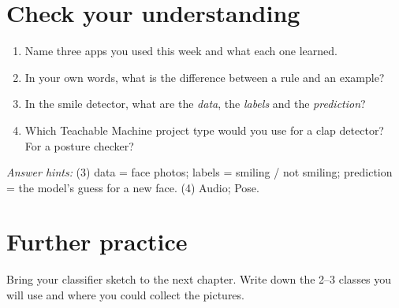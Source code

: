 \section*{Check your understanding}

\begin{enumerate}
\item Name three apps you used this week and what each one learned.
\item In your own words, what is the difference between a rule and an example?
\item In the smile detector, what are the \emph{data}, the \emph{labels} and the \emph{prediction}?
\item Which Teachable Machine project type would you use for a clap detector? For a posture checker?
\end{enumerate}

\emph{Answer hints:} (3) data = face photos; labels = smiling / not smiling; prediction = the model’s guess for a new face. (4) Audio; Pose.


\section*{Further practice}

Bring your classifier sketch to the next chapter. Write down the 2–3 classes you will use and where you could collect the pictures.


\medskip\noindent\hrulefill\medskip
